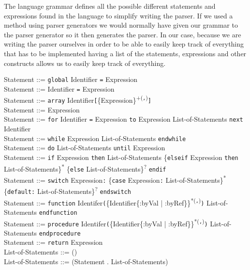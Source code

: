 \documentclass{article}
\begin{document}
The language grammar defines all the possible different statements and
expressions found in the language to simplify writing the parser. If we used a
method using parser generators we would normally have given our grammar to the
parser generator so it then generates the parser. In our case, because we are
writing the parser ourselves in order to be able to easily keep track of
everything that has to be implemented having a list of the statements,
expressions and other constructs allows us to easily keep track of everything.

\noindent
Statement ::= \texttt{global} Identifier \texttt{=} Expression\\
Statement ::= Identifier \texttt{=} Expression\\
Statement ::= \texttt{array} Identifier\texttt{[}\{Expression\}\textsuperscript{+(\texttt{,})}\texttt{]}\\
Statement ::= Expression\\
Statement ::= \texttt{for} Identifier \texttt{=} Expression \texttt{to} Expression List-of-Statements \texttt{next} Identifier\\
Statement ::= \texttt{while} Expression List-of-Statements \texttt{endwhile}\\
Statement ::= \texttt{do} List-of-Statements \texttt{until} Expression\\

\noindent
Statement ::= \texttt{if} Expression \texttt{then} List-of-Statements \{\texttt{elseif} Expression \texttt{then} List-of-Statements\}\textsuperscript{*} \{\texttt{else} List-of-Statements\}\textsuperscript{?} \texttt{endif}\\
Statement ::= \texttt{switch} Expression\texttt{:} \{\texttt{case} Expression\texttt{:} List-of-Statements\}\textsuperscript{*} \{\texttt{default:} List-of-Statements\}\textsuperscript{?} \texttt{endswitch}\\

\noindent
Statement ::= \texttt{function} Identifer\texttt{(}\{Identifier\{:byVal | :byRef\}\}\textsuperscript{*(\texttt{,})}\texttt{)} List-of-Statements \texttt{endfunction}\\
Statement ::= \texttt{procedure} Identifer\texttt{(}\{Identifier\{:byVal | :byRef\}\}\textsuperscript{*(\texttt{,})}\texttt{)} List-of-Statements \texttt{endprocedure}\\
Statement ::= \texttt{return} Expression\\

\noindent
List-of-Statements ::= ()\\
List-of-Statements ::= (Statement . List-of-Statements)\\
\end{document}
